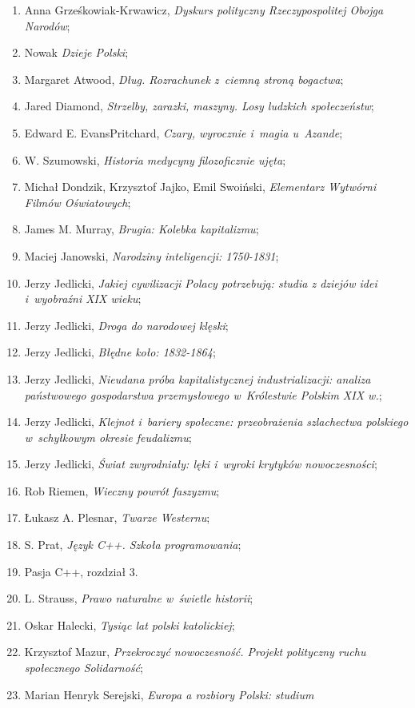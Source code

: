 \documentclass[a4paper,11pt]{article}
\begin{document}
\begin{enumerate}
\item Anna Grześkowiak-Krwawicz, \emph{Dyskurs polityczny
    Rzeczypospolitej Obojga Narodów};
\item Nowak \emph{Dzieje Polski};
\item Margaret Atwood, \emph{Dług. Rozrachunek z~ciemną stroną
    bogactwa};
\item Jared Diamond, \emph{Strzelby, zarazki, maszyny. Losy ludzkich
    społeczeństw};
\item Edward E. Evans\dywiz Pritchard, \emph{Czary, wyrocznie i~magia
    u~Azande};
\item W. Szumowski, \emph{Historia medycyny filozoficznie ujęta};
\item Michał Dondzik, Krzysztof Jajko, Emil Swoiński, \emph{Elementarz
    Wytwórni Filmów Oświatowych};
\item James M. Murray, \emph{Brugia: Kolebka kapitalizmu};
\item Maciej Janowski, \emph{Narodziny inteligencji: 1750-1831};
\item Jerzy Jedlicki, \emph{Jakiej cywilizacji Polacy potrzebują:
    studia z dziejów idei i~wyobraźni XIX wieku};
\item Jerzy Jedlicki, \emph{Droga do narodowej klęski};
\item Jerzy Jedlicki, \emph{Błędne koło: 1832-1864};
\item Jerzy Jedlicki, \emph{Nieudana próba kapitalistycznej
    industrializacji: analiza państwowego gospodarstwa przemysłowego
    w~Królestwie Polskim XIX w.};
\item Jerzy Jedlicki, \emph{Klejnot i~bariery społeczne: przeobrażenia
    szlachectwa polskiego w~schyłkowym okresie feudalizmu};
\item Jerzy Jedlicki, \emph{Świat zwyrodniały: lęki i~wyroki krytyków
    nowoczesności};
\item Rob Riemen, \emph{Wieczny powrót faszyzmu};
\item Łukasz A. Plesnar, \emph{Twarze Westernu};
\item S. Prat, \emph{Język C++. Szkoła programowania};
\item Pasja C++, rozdział 3.
\item L. Strauss, \emph{Prawo naturalne w~świetle historii};
\item Oskar Halecki, \emph{Tysiąc lat polski katolickiej};
\item Krzysztof Mazur, \emph{Przekroczyć nowoczesność. Projekt
    polityczny ruchu społecznego Solidarność};
\item Marian Henryk Serejski, \emph{Europa a rozbiory Polski: studium
}
\end{enumerate}
\end{document}

